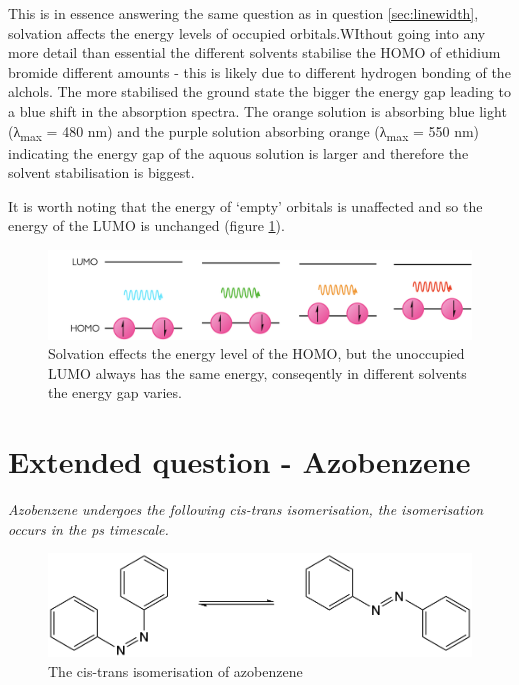 \documentclass[
]{book}
\begin{document}
This is in essence answering the same question as in question \ref{sec:linewidth}, solvation affects the energy levels of occupied orbitals.WIthout going into any more detail than essential the different solvents stabilise the HOMO of ethidium bromide different amounts - this is likely due to different hydrogen bonding of the alchols. The more stabilised the ground state the bigger the energy gap leading to a blue shift in the absorption spectra. The orange solution is absorbing blue light (λ\textsubscript{max} = 480 nm) and the purple solution absorbing orange (λ\textsubscript{max} = 550 nm) indicating the energy gap of the aquous solution is larger and therefore the solvent stabilisation is biggest.

It is worth noting that the energy of `empty' orbitals is unaffected and so the energy of the LUMO is unchanged (figure \ref{fig:solvato}).

\begin{figure}

{\centering \includegraphics[width=0.7\linewidth]{images/solvatochromism} 

}

\caption{Solvation effects the energy level of the HOMO, but the unoccupied LUMO always has the same energy, conseqently in different solvents the energy gap varies.}\label{fig:solvato}
\end{figure}

\hypertarget{sec:Azobenzene}{%
\section{Extended question - Azobenzene}\label{sec:Azobenzene}}

\emph{Azobenzene undergoes the following cis-trans isomerisation, the isomerisation occurs in the ps timescale.}

\begin{figure}

{\centering \includegraphics[width=0.7\linewidth]{images/cistransazobenzene} 

}

\caption{The cis-trans isomerisation of azobenzene}\label{fig:cistransazobenzene}
\end{figure}
\end{document}
